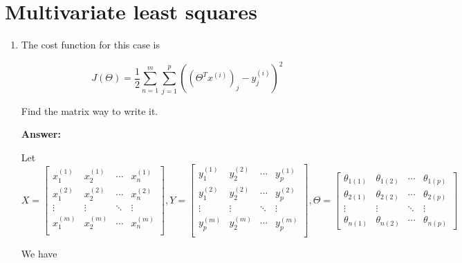 \documentclass[a4paper,14pt]{article}
\begin{document}
\section{Multivariate least squares}
\begin{enumerate}[label=(\alph*)]
    \item The cost function for this case is

\begin{equation*}
    J(\Theta) = \frac{1}{2}\sum_{n=1}^{m}\sum_{j=1}^{p}\left( \left( \Theta^{T}x^{(i)} \right)_{j} - y_{j}^{(i)} \right)^{2}
\end{equation*}

Find the matrix way to write it.

\textbf{Answer:}

Let $ X = \begin{bmatrix}
    x_{1}^{(1)} & x_{2}^{(1)} & \cdots & x_{n}^{(1)}\\
    x_{1}^{(2)} & x_{2}^{(2)} & \cdots & x_{n}^{(2)}\\
    \vdots      & \vdots      & \ddots & \vdots     \\
    x_{1}^{(m)} & x_{2}^{(m)} & \cdots & x_{n}^{(m)}\\
\end{bmatrix}, Y = \begin{bmatrix}
    y_{1}^{(1)} & y_{2}^{(2)} & \cdots & y_{p}^{(1)}\\
    y_{1}^{(2)} & y_{2}^{(2)} & \cdots & y_{p}^{(2)}\\
    \vdots      & \vdots      & \ddots & \vdots     \\
    y_{p}^{(m)} & y_{2}^{(m)} & \cdots & y_{p}^{(m)}\\
\end{bmatrix}, \Theta = \begin{bmatrix}
    \theta_{1(1)} & \theta_{1(2)} & \cdots & \theta_{1(p)}\\
    \theta_{2(1)} & \theta_{2(2)} & \cdots & \theta_{2(p)}\\
    \vdots        & \vdots        & \ddots & \vdots \\
    \theta_{n(1)} & \theta_{n(2)} & \cdots & \theta_{n(p)}
\end{bmatrix}$

We have 


\end{enumerate}
\end{document}
